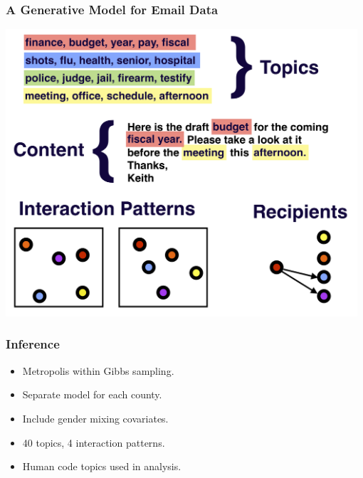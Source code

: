 \documentclass[xcolor={table}]{beamer}
\newenvironment{changemargin}[2]{%
  \begin{list}{}{%
    \setlength{\topsep}{0pt}%
    \setlength{\leftmargin}{#1}%
    \setlength{\rightmargin}{#2}%
    \setlength{\listparindent}{\parindent}%
    \setlength{\itemindent}{\parindent}%
    \setlength{\parsep}{\parskip}%
  }%
  \item[]}{\end{list}}
\begin{document}
\begin{frame}\frametitle{A Generative Model for Email Data}
	\begin{changemargin}{-1cm}{ -1cm}
    \centering
	\includegraphics[width=0.98\textwidth]{images/Generative_Process.png}
	\end{changemargin} 
\end{frame}

\begin{frame}\frametitle{Inference}
	\LARGE
	\begin{itemize}
		\item Metropolis within Gibbs sampling.
		\vspace*{.3in}
		\item Separate model for each county.
		\vspace*{.3in}
		\item Include gender mixing covariates.
		\vspace*{.3in}
		\item 40 topics, 4 interaction patterns.
		\vspace*{.3in}
		\item Human code topics used in analysis.
	\end{itemize}
\end{frame}
\end{document}

